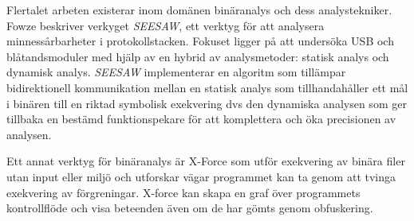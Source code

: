 Flertalet arbeten existerar inom domänen binäranalys och dess analystekniker. Fowze \cite{fowze_mem_vul}
beskriver verkyget \emph{SEESAW}, ett verktyg för att analysera
minnessårbarheter i protokollstacken. Fokuset ligger på att undersöka USB och
blåtandsmoduler med hjälp av en hybrid av analysmetoder: statisk analys och
dynamisk analys. \emph{SEESAW} implementerar en algoritm som tillämpar
bidirektionell kommunikation mellan en statisk analys som tillhandahåller ett
mål i binären till en riktad symbolisk exekvering dvs den dynamiska analysen som
ger tillbaka en bestämd funktionspekare för att komplettera och öka precisionen
av analysen.  

Ett annat verktyg för binäranalys är X-Force som utför exekvering av binära 
filer utan input eller miljö och utforskar vägar programmet kan ta genom att 
tvinga exekvering av förgreningar\cite{xforce}. X-force kan skapa en graf över 
programmets kontrollflöde och visa beteenden även om de har gömts genom
obfuskering.
